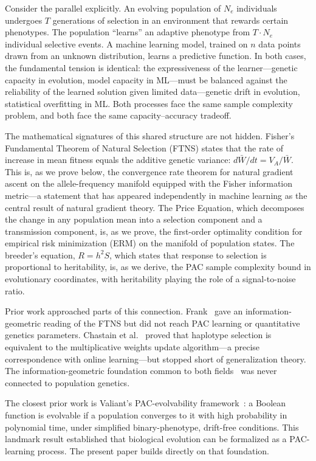 \documentclass[12pt]{article}
\theoremstyle{remark}
\begin{document}
Consider the parallel explicitly. An evolving population of $N_e$ individuals undergoes $T$ generations of selection in an environment that rewards certain phenotypes. The population ``learns'' an adaptive phenotype from $T \cdot N_e$ individual selective events. A machine learning model, trained on $n$ data points drawn from an unknown distribution, learns a predictive function. In both cases, the fundamental tension is identical: the expressiveness of the learner---genetic capacity in evolution, model capacity in ML---must be balanced against the reliability of the learned solution given limited data---genetic drift in evolution, statistical overfitting in ML. Both processes face the same sample complexity problem, and both face the same capacity--accuracy tradeoff.

The mathematical signatures of this shared structure are not hidden. Fisher's Fundamental Theorem of Natural Selection (FTNS) states that the rate of increase in mean fitness equals the additive genetic variance: $d\bar{W}/dt = V_A/\bar{W}$. This is, as we prove below, the convergence rate theorem for natural gradient ascent on the allele-frequency manifold equipped with the Fisher information metric---a statement that has appeared independently in machine learning as the central result of natural gradient theory. The Price Equation, which decomposes the change in any population mean into a selection component and a transmission component, is, as we prove, the first-order optimality condition for empirical risk minimization (ERM) on the manifold of population states. The breeder's equation, $R = h^2 S$, which states that response to selection is proportional to heritability, is, as we derive, the PAC sample complexity bound in evolutionary coordinates, with heritability playing the role of a signal-to-noise ratio.

Prior work approached parts of this connection. Frank~\cite{frank2009,frank2012} gave an information-geometric reading of the FTNS but did not reach PAC learning or quantitative genetics parameters. Chastain et al.~\cite{chastain2014} proved that haplotype selection is equivalent to the multiplicative weights update algorithm---a precise correspondence with online learning---but stopped short of generalization theory. The information-geometric foundation common to both fields~\cite{amari2000} was never connected to population genetics.

The closest prior work is Valiant's PAC-evolvability framework~\cite{valiant2009}: a Boolean function is evolvable if a population converges to it with high probability in polynomial time, under simplified binary-phenotype, drift-free conditions. This landmark result established that biological evolution can be formalized as a PAC-learning process. The present paper builds directly on that foundation.
\end{document}

